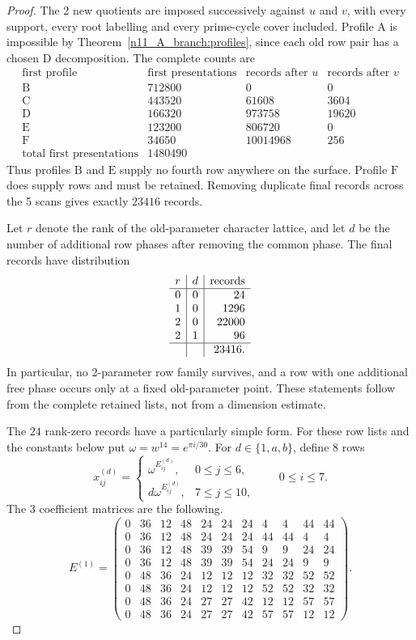 \documentclass[11pt,a4paper]{article}
\theoremstyle{plain}
\theoremstyle{definition}
\theoremstyle{plain}
\begin{document}
\begin{proof}
The 2 new quotients are imposed successively against $u$ and $v$, with every support, every root labelling and every prime-cycle cover included. Profile $\mathrm{A}$ is impossible by Theorem~\ref{n11_A_branch:profiles}, since each old row pair has a chosen $\mathrm{D}$ decomposition. The complete counts are
\[
\begin{array}{c|r|r|r}
\text{first profile}&\text{first presentations}&
 \text{records after }u&\text{records after }v\\\hline
\mathrm{B}&712800&0&0\\
\mathrm{C}&443520&61608&3604\\
\mathrm{D}&166320&973758&19620\\
\mathrm{E}&123200&806720&0\\
\mathrm{F}&34650&10014968&256\\\hline
\text{total first presentations}&1480490&&
\end{array}
\]
Thus profiles $\mathrm{B}$ and $\mathrm{E}$ supply no fourth row anywhere on the surface. Profile $\mathrm{F}$ does supply rows and must be retained. Removing duplicate final records across the 5 scans gives exactly $23416$ records.

Let $r$ denote the rank of the old-parameter character lattice, and let $d$ be the number of additional row phases after removing the common phase. The final records have distribution
\[
\begin{array}{c|c|r}
r&d&\text{records}\\\hline
0&0&24\\
1&0&1296\\
2&0&22000\\
2&1&96\\\hline
&&23416.
\end{array}
\]
In particular, no 2-parameter row family survives, and a row with one additional free phase occurs only at a fixed old-parameter point. These statements follow from the complete retained lists, not from a dimension estimate.

\medskip
The $24$ rank-zero records have a particularly simple form. For these row lists and the constants below put $\omega=w^{14}=e^{\pi i/30}$. For $d\in\{1,a,b\}$, define 8 rows
\[
x^{(d)}_{ij}=
\begin{cases}
\omega^{E^{(d)}_{ij}},&0\le j\le6,\\
d\omega^{E^{(d)}_{ij}},&7\le j\le10,
\end{cases}
\qquad 0\le i\le7.
\]
The 3 coefficient matrices are the following.
\[
E^{(1)}=\begin{pmatrix}
0&36&12&48&24&24&24&4&4&44&44\\
0&36&12&48&24&24&24&44&44&4&4\\
0&36&12&48&39&39&54&9&9&24&24\\
0&36&12&48&39&39&54&24&24&9&9\\
0&48&36&24&12&12&12&32&32&52&52\\
0&48&36&24&12&12&12&52&52&32&32\\
0&48&36&24&27&27&42&12&12&57&57\\
0&48&36&24&27&27&42&57&57&12&12
\end{pmatrix}.
\]


\end{proof}
\end{document}
